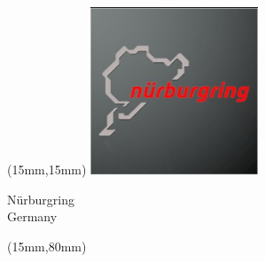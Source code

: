 \begin{textblock*}{50mm}(15mm,15mm)%
\includegraphics[width=50mm]{LG/2015-05-20_00089.png}
\par Nürburgring\\ Germany
\end{textblock*}
\begin{textblock*}{185mm}(15mm,80mm)%
\end{textblock*}
